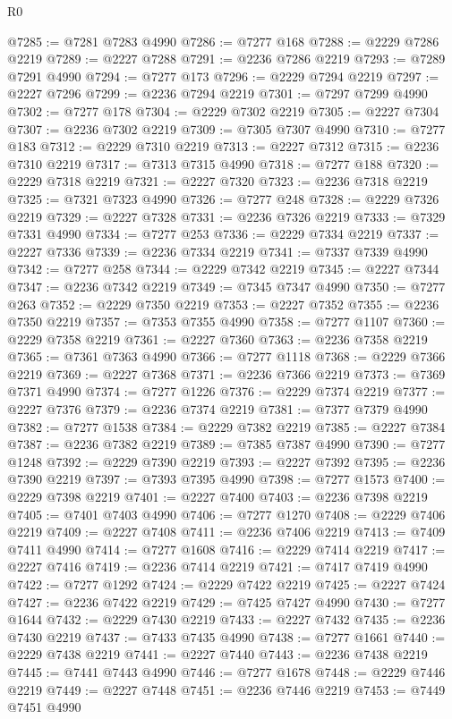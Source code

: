 \begin{lexlean}{R0}
\begin{coremodule}
@7285 := @7281 @7283 @4990
@7286 := @7277 @168
@7288 := @2229 @7286 @2219
@7289 := @2227 @7288
@7291 := @2236 @7286 @2219
@7293 := @7289 @7291 @4990
@7294 := @7277 @173
@7296 := @2229 @7294 @2219
@7297 := @2227 @7296
@7299 := @2236 @7294 @2219
@7301 := @7297 @7299 @4990
@7302 := @7277 @178
@7304 := @2229 @7302 @2219
@7305 := @2227 @7304
@7307 := @2236 @7302 @2219
@7309 := @7305 @7307 @4990
@7310 := @7277 @183
@7312 := @2229 @7310 @2219
@7313 := @2227 @7312
@7315 := @2236 @7310 @2219
@7317 := @7313 @7315 @4990
@7318 := @7277 @188
@7320 := @2229 @7318 @2219
@7321 := @2227 @7320
@7323 := @2236 @7318 @2219
@7325 := @7321 @7323 @4990
@7326 := @7277 @248
@7328 := @2229 @7326 @2219
@7329 := @2227 @7328
@7331 := @2236 @7326 @2219
@7333 := @7329 @7331 @4990
@7334 := @7277 @253
@7336 := @2229 @7334 @2219
@7337 := @2227 @7336
@7339 := @2236 @7334 @2219
@7341 := @7337 @7339 @4990
@7342 := @7277 @258
@7344 := @2229 @7342 @2219
@7345 := @2227 @7344
@7347 := @2236 @7342 @2219
@7349 := @7345 @7347 @4990
@7350 := @7277 @263
@7352 := @2229 @7350 @2219
@7353 := @2227 @7352
@7355 := @2236 @7350 @2219
@7357 := @7353 @7355 @4990
@7358 := @7277 @1107
@7360 := @2229 @7358 @2219
@7361 := @2227 @7360
@7363 := @2236 @7358 @2219
@7365 := @7361 @7363 @4990
@7366 := @7277 @1118
@7368 := @2229 @7366 @2219
@7369 := @2227 @7368
@7371 := @2236 @7366 @2219
@7373 := @7369 @7371 @4990
@7374 := @7277 @1226
@7376 := @2229 @7374 @2219
@7377 := @2227 @7376
@7379 := @2236 @7374 @2219
@7381 := @7377 @7379 @4990
@7382 := @7277 @1538
@7384 := @2229 @7382 @2219
@7385 := @2227 @7384
@7387 := @2236 @7382 @2219
@7389 := @7385 @7387 @4990
@7390 := @7277 @1248
@7392 := @2229 @7390 @2219
@7393 := @2227 @7392
@7395 := @2236 @7390 @2219
@7397 := @7393 @7395 @4990
@7398 := @7277 @1573
@7400 := @2229 @7398 @2219
@7401 := @2227 @7400
@7403 := @2236 @7398 @2219
@7405 := @7401 @7403 @4990
@7406 := @7277 @1270
@7408 := @2229 @7406 @2219
@7409 := @2227 @7408
@7411 := @2236 @7406 @2219
@7413 := @7409 @7411 @4990
@7414 := @7277 @1608
@7416 := @2229 @7414 @2219
@7417 := @2227 @7416
@7419 := @2236 @7414 @2219
@7421 := @7417 @7419 @4990
@7422 := @7277 @1292
@7424 := @2229 @7422 @2219
@7425 := @2227 @7424
@7427 := @2236 @7422 @2219
@7429 := @7425 @7427 @4990
@7430 := @7277 @1644
@7432 := @2229 @7430 @2219
@7433 := @2227 @7432
@7435 := @2236 @7430 @2219
@7437 := @7433 @7435 @4990
@7438 := @7277 @1661
@7440 := @2229 @7438 @2219
@7441 := @2227 @7440
@7443 := @2236 @7438 @2219
@7445 := @7441 @7443 @4990
@7446 := @7277 @1678
@7448 := @2229 @7446 @2219
@7449 := @2227 @7448
@7451 := @2236 @7446 @2219
@7453 := @7449 @7451 @4990

\end{coremodule}
\end{lexlean}
